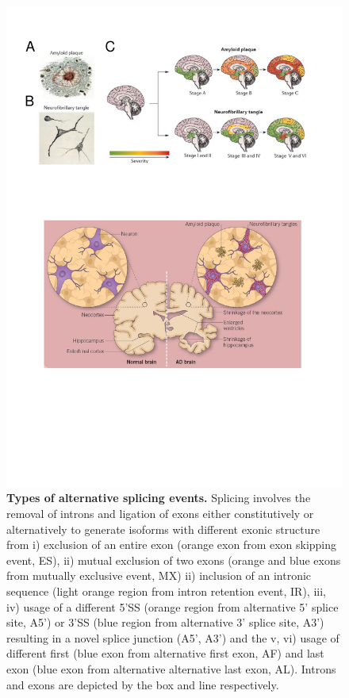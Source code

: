 \begin{figure}[!ht]
	\centering
	\includegraphics[page=9,trim={0 16cm 0cm 0},clip, scale = 0.7]{Figures/Introduction_Figures.pdf}
	\captionsetup{width=0.95\textwidth,singlelinecheck=off}
	\caption[Types of alternative splicing events]%
	{\textbf{Types of alternative splicing events.} Splicing involves the removal of introns and ligation of exons either constitutively or alternatively to generate isoforms with different exonic structure from i) exclusion of an entire exon (orange exon from exon skipping event, ES), ii) mutual exclusion of two exons (orange and blue exons from mutually exclusive event, MX) ii) inclusion of an intronic sequence (light orange region from intron retention event, IR), iii, iv) usage of a different 5'SS (orange region from alternative 5' splice site, A5') or 3'SS (blue region from alternative 3' splice site, A3') resulting in a novel splice junction (A5', A3') and the v, vi) usage of different first (blue exon from alternative first exon, AF) and last exon (blue exon from alternative alternative last exon, AL). Introns and exons are depicted by the box and line respectively. 
	}
	\label{fig:AS_events}
\end{figure}

